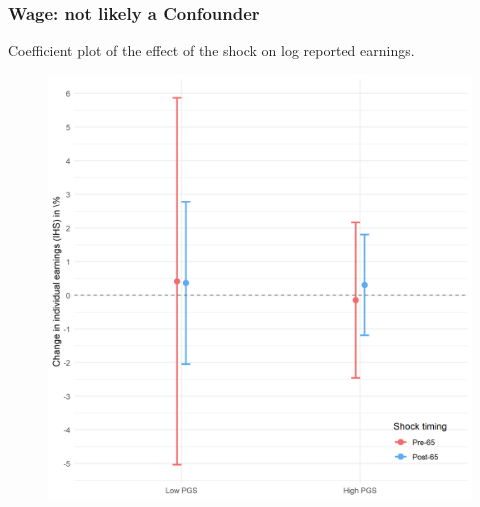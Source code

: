 \documentclass[10pt,compress,xcolor=dvipsnames,aspectratio=169]{beamer}    %
\newcounter{ex}
\newcommand{\1}[1]{\mathrm{1\hspace*{-2.5pt}l}[#1]}	%
\begin{document}
\begin{frame}
\frametitle{Wage: not likely a Confounder}
Coefficient plot of the effect of the shock on log reported earnings.
\begin{figure}[hbtp]
\centering
\includegraphics[height=0.8\textheight]{../../3_output/shock_effects/IHSwage_6070_100_cv.png}
\label{fig:wage}
\end{figure}
\end{frame}
\end{document}
